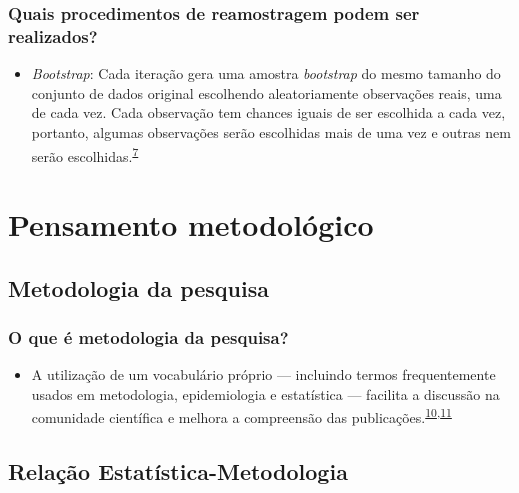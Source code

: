 \documentclass[
  a4paper,
]{book}
\providecommand{\tightlist}{%
  \setlength{\itemsep}{0pt}\setlength{\parskip}{0pt}}
\begin{document}
\hypertarget{quais-procedimentos-de-reamostragem-podem-ser-realizados}{%
\subsection{Quais procedimentos de reamostragem podem ser realizados?}\label{quais-procedimentos-de-reamostragem-podem-ser-realizados}}

\begin{itemize}
\tightlist
\item
  \emph{Bootstrap}: Cada iteração gera uma amostra \emph{bootstrap} do mesmo tamanho do conjunto de dados original escolhendo aleatoriamente observações reais, uma de cada vez. Cada observação tem chances iguais de ser escolhida a cada vez, portanto, algumas observações serão escolhidas mais de uma vez e outras nem serão escolhidas.\textsuperscript{\protect\hyperlink{ref-Bland2015}{7}}
\end{itemize}

\hypertarget{pensamento-metodologico}{%
\chapter{\texorpdfstring{\textbf{Pensamento metodológico}}{Pensamento metodológico}}\label{pensamento-metodologico}}

\hypertarget{metodologia-da-pesquisa}{%
\section{Metodologia da pesquisa}\label{metodologia-da-pesquisa}}

\hypertarget{o-que-uxe9-metodologia-da-pesquisa}{%
\subsection{O que é metodologia da pesquisa?}\label{o-que-uxe9-metodologia-da-pesquisa}}

\begin{itemize}
\tightlist
\item
  A utilização de um vocabulário próprio --- incluindo termos frequentemente usados em metodologia, epidemiologia e estatística --- facilita a discussão na comunidade científica e melhora a compreensão das publicações.\textsuperscript{\protect\hyperlink{ref-amatuzzi2006}{10},\protect\hyperlink{ref-amatuzzi2006a}{11}}
\end{itemize}

\hypertarget{relauxe7uxe3o-estatuxedstica-metodologia}{%
\section{Relação Estatística-Metodologia}\label{relauxe7uxe3o-estatuxedstica-metodologia}}
\end{document}
